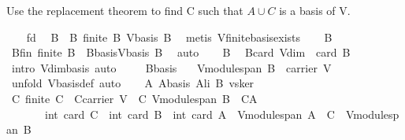 \begin{isabellebody}
\begin{isamarkuptxt}
Use the replacement theorem to find C such that $A\cup C$ is a basis of V.%
\end{isamarkuptxt}%
\isamarkuptrue%
\ \ \isamarkupfalse%
\ fd\ \isamarkupfalse%
\ B\ \ B{\isacharcolon}\ {\isachardoublequoteopen}finite\ B{\isasymand}\ V{\isachardot}basis\ B{\isachardoublequoteclose}\ \isamarkupfalse%
\ {\isacharparenleft}metis\ V{\isachardot}finite{\isacharunderscore}basis{\isacharunderscore}exists{\isacharparenright}\isanewline
\ \ \isamarkupfalse%
\ B\ \isamarkupfalse%
\ Bfin{\isacharcolon}\ {\isachardoublequoteopen}finite\ B{\isachardoublequoteclose}\ \ Bbasis{\isacharcolon}{\isachardoublequoteopen}V{\isachardot}basis\ B{\isachardoublequoteclose}\ \isamarkupfalse%
\ auto\isanewline
\ \ \isamarkupfalse%
\ B\ \isamarkupfalse%
\ Bcard{\isacharcolon}\ {\isachardoublequoteopen}V{\isachardot}dim\ {\isacharequal}\ card\ B{\isachardoublequoteclose}\ \isamarkupfalse%
\ {\isacharparenleft}intro\ V{\isachardot}dim{\isacharunderscore}basis{\isacharcomma}\ auto{\isacharparenright}\ \isanewline
\ \ \isamarkupfalse%
\ Bbasis\ \isamarkupfalse%
\ {}{}{\isacharcolon}\ {\isachardoublequoteopen}V{\isachardot}module{\isachardot}span\ B\ {\isacharequal}\ carrier\ V{\isachardoublequoteclose}\ \isanewline
\ \ \ \ \isamarkupfalse%
\ {\isacharparenleft}unfold\ V{\isachardot}basis{\isacharunderscore}def{\isacharcomma}\ auto{\isacharparenright}\isanewline
\ \ \isamarkupfalse%
\ A\ Abasis\ Ali\ B\ vs{\isacharunderscore}ker\ \isamarkupfalse%
\ {\isachardoublequoteopen}{\isasymexists}C{\isachardot}\ finite\ C\ {\isasymand}\ C{\isasymsubseteq}carrier\ V\ {\isasymand}\ C{\isasymsubseteq}\ V{\isachardot}module{\isachardot}span\ B\ {\isasymand}\ C{\isasyminter}A{\isacharequal}{\isacharbraceleft}{\isacharbraceright}\ \isanewline
\ \ \ \ \ \ {\isasymand}\ int\ {\isacharparenleft}card\ C{\isacharparenright}\ {\isasymle}\ {\isacharparenleft}int\ {\isacharparenleft}card\ B{\isacharparenright}{\isacharparenright}\ {\isacharminus}\ {\isacharparenleft}int\ {\isacharparenleft}card\ A{\isacharparenright}{\isacharparenright}\ {\isasymand}\ {\isacharparenleft}V{\isachardot}module{\isachardot}span\ {\isacharparenleft}A\ {\isasymunion}\ C{\isacharparenright}\ {\isacharequal}\ V{\isachardot}module{\isachardot}span\ B{\isacharparenright}{\isachardoublequoteclose}\isanewline
\ \ \ \ \isamarkupfalse%

\end{isabellebody}

